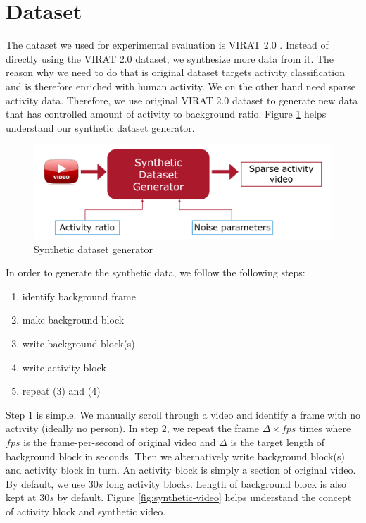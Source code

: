 \section{Dataset}
The dataset we used for experimental evaluation is VIRAT 2.0 \cite{virat20}. Instead of directly using the VIRAT 2.0 dataset, we synthesize more data from it. The reason why we need to do that is original dataset targets activity classification and is therefore enriched with human activity. We on the other hand need sparse activity data. Therefore, we use original VIRAT 2.0 dataset to generate new data that has controlled amount of activity to background ratio. Figure \ref{fig:synthetic-dataset-generator} helps understand our synthetic dataset generator.  

\begin{figure}
    \centering
    \includegraphics[width=\linewidth]{images/synthetic-dataset-generator.PNG}
    \caption{Synthetic dataset generator}
    \label{fig:synthetic-dataset-generator}
\end{figure}

In order to generate the synthetic data, we follow the following steps:
\begin{enumerate} 
    \item identify background frame
    \item make background block
    \item write background block(s)
    \item write activity block
    \item repeat (3) and (4)
\end{enumerate}

Step 1 is simple. We manually scroll through a video and identify a frame with no activity (ideally no person). In step 2, we repeat the frame $\Delta \times fps$ times where $fps$ is the frame-per-second of original video and $\Delta$ is the target length of background block in seconds. Then we alternatively write background block(s) and activity block in turn. An activity block is simply a section of original video. By default, we use $30s$ long activity blocks. Length of background block is also kept at $30s$ by default. Figure \ref{fig:synthetic-video} helps understand the concept of activity block and synthetic video.  

